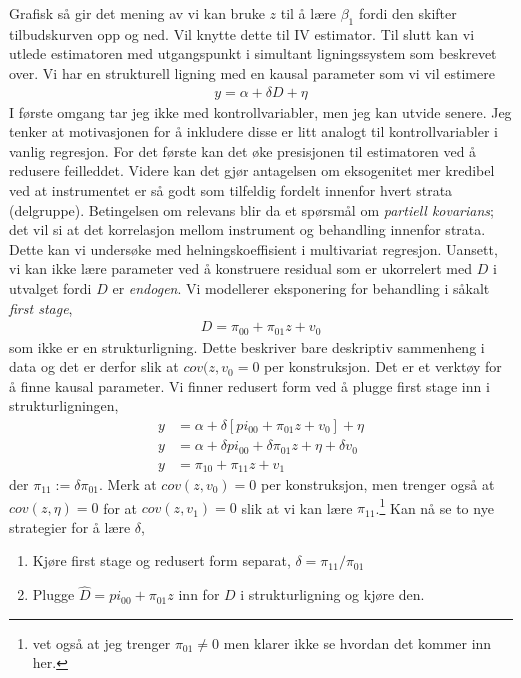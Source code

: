 Grafisk så gir det mening av vi kan bruke $z$ til å lære $\beta_1$ fordi den skifter tilbudskurven opp og ned. Vil knytte dette til IV estimator.
Til slutt kan vi utlede estimatoren med utgangspunkt i simultant ligningssystem som beskrevet over. Vi har en strukturell ligning med en kausal parameter som vi vil estimere
\begin{align}
y = \alpha + \delta D + \eta
\end{align}
I første omgang tar jeg ikke med kontrollvariabler, men jeg kan utvide senere. Jeg tenker at motivasjonen for å inkludere disse er litt analogt til kontrollvariabler i vanlig regresjon. For det første kan det øke presisjonen til estimatoren ved å redusere feilleddet. Videre kan det gjør antagelsen om eksogenitet mer kredibel ved at instrumentet er så godt som tilfeldig fordelt innenfor hvert strata (delgruppe). Betingelsen om relevans blir da et spørsmål om \textit{partiell kovarians}; det vil si at det korrelasjon mellom instrument og behandling innenfor strata. Dette kan vi undersøke med helningskoeffisient i multivariat regresjon. Uansett, vi kan ikke lære parameter ved å konstruere residual som er ukorrelert med $D$ i utvalget fordi $D$ er \textit{endogen}. Vi modellerer eksponering for behandling i såkalt \textit{first stage},
\begin{align}
D = \pi_{00}+\pi_{01}z+v_0
\end{align}
som ikke er en strukturligning. Dette beskriver bare deskriptiv sammenheng i data og det er derfor slik at $cov(z,v_0=0$ per konstruksjon. Det er et verktøy for å finne kausal parameter. Vi finner redusert form ved å plugge first stage inn i strukturligningen,
\begin{align}
y &= \alpha + \delta [pi_{00}+\pi_{01}z+v_0] + \eta \\
y &= \alpha + \delta pi_{00} + \delta \pi_{01}z   +\eta+\delta v_0 \\
y &= \pi_{10} + \pi_{11} z + v_1
\end{align}
der $\pi_{11} := \delta \pi_{01} $. Merk at $cov(z,v_0)=0$ per konstruksjon, men trenger også at $cov(z,\eta)=0$ for at $cov(z,v_1)=0$ slik at vi kan lære $\pi_{11}$.\footnote{vet også at jeg trenger $\pi_{01} \neq 0$ men klarer ikke se hvordan det kommer inn her.} Kan nå se to nye strategier for å lære $\delta$,
\begin{enumerate}
\item Kjøre first stage og redusert form separat, $\delta = \pi_{11}/\pi_{01}$ 
\item Plugge $\hat{D} = pi_{00}+\pi_{01}z $ inn for $D$ i strukturligning og kjøre den.
\end{enumerate}
